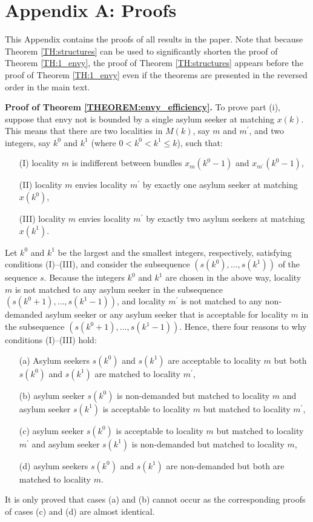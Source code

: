 \documentclass[12pt,fleqn]{article}
\begin{document}


\newpage

\section*{Appendix A: Proofs}
This Appendix contains the proofs of all results in the paper. Note that because Theorem \ref{TH:structures} can be used to significantly shorten the proof of Theorem \ref{TH:1_envy}, the proof of Theorem \ref{TH:structures} appears before the proof of Theorem \ref{TH:1_envy} even if the theorems are presented in the reversed order in the main text.

\medskip

\noindent\textbf{Proof of Theorem \ref{THEOREM:envy_efficiency}.} To prove part (i), suppose that envy not is bounded by a single asylum seeker at matching $x(k)$. This means that there are two localities in $M(k)$, say $m$ and $m^\prime$, and two integers, say $k^0$ and $k^1$ (where $0<k^0<k^1\leq k$), such that:
\begin{itemize}
\item[(I)] locality $m$ is indifferent between bundles $x_{m}(k^0-1)$ and $x_{m^\prime}(k^0-1)$,
\item[(II)] locality $m$ envies locality $m^\prime$ by exactly one asylum seeker at matching $x(k^0)$,
\item[(III)] locality $m$ envies locality $m^\prime$ by exactly two asylum seekers at matching $x(k^1)$.
\end{itemize}
\noindent Let $k^0$ and $k^1$ be the largest and the smallest integers, respectively, satisfying conditions (I)--(III), and consider the subsequence $(s(k^0),\ldots,s(k^1))$ of the sequence $s$. Because the integers $k^0$ and $k^1$ are chosen in the above way, locality $m$ is not matched to any asylum seeker in the subsequence $(s(k^0+1),\ldots,s(k^1-1))$, and
locality $m^\prime$ is not matched to any non-demanded asylum seeker or any asylum seeker that is acceptable for locality $m$ in the subsequence $(s(k^0+1),\ldots,s(k^1-1))$. Hence, there four reasons to why conditions (I)--(III) hold:
\begin{itemize}
\item[(a)] Asylum seekers $s(k^0)$ and $s(k^1)$ are acceptable to locality $m$ but both $s(k^0)$ and $s(k^1)$ are matched to locality $m^\prime$,
\item[(b)] asylum seeker $s(k^0)$ is non-demanded but matched to locality $m$ and asylum seeker $s(k^1)$ is acceptable to locality $m$ but matched to locality $m^\prime$,
\item[(c)] asylum seeker $s(k^0)$ is acceptable to locality $m$ but matched to locality $m^\prime$ and asylum seeker $s(k^1)$ is non-demanded but matched to locality $m$,
\item[(d)] asylum seekers $s(k^0)$ and $s(k^1)$ are non-demanded but both are matched to locality $m$.
\end{itemize}
\noindent It is only proved that cases (a) and (b) cannot occur as the corresponding proofs of cases (c) and (d) are almost identical.
\end{document}
